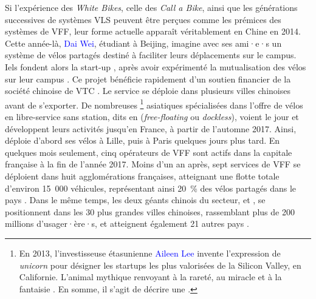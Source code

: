 \begin{refsegment}
Si l’expérience des \textsl{White Bikes}, celle des \textsl{Call a Bike}, ainsi que les générations successives de systèmes \acrshort{VLS} peuvent être perçues comme les prémices des systèmes de \acrshort{VFF}, leur forme actuelle apparaît véritablement en Chine en 2014. Cette année-là, \textcolor{blue}{Dai Wei}, étudiant à Beijing, imagine avec ses ami·e·s un système de vélos partagés destiné à faciliter leurs déplacements sur le campus. Iels fondent alors la start-up , après avoir expérimenté la mutualisation des vélos sur leur campus \textcolor{blue}{\autocite[10]{nlc_micromobility_2019}}. Ce projet bénéficie rapidement d’un soutien financier de la société chinoise de \acrshort{VTC}  \textcolor{blue}{\autocite[18]{6t-bureau_de_recherche_etude_2018}}. Le service se déploie dans plusieurs villes chinoises avant de s’exporter. De nombreuses \footnote{
    En 2013, l'investisseuse étasunienne \textcolor{blue}{Aileen Lee} invente l'expression de  \textsl{unicorn} pour désigner les startups les plus valorisées de la Silicon Valley, en Californie. L'animal mythique renvoyant à la rareté, au miracle et à la fantaisie \textcolor{blue}{\autocite{benner_unicorn_2015}}. En somme, il s'agit de décrire une  \textcolor{blue}{\autocite{chambre_de_commerce_et_dindustrie_licornes_2019}}.
} asiatiques spécialisées dans l’offre de vélos en libre-service sans station, dits en  (\textsl{free-floating} ou \textsl{dockless}), voient le jour et développent leurs activités jusqu’en France, à partir de l'automne 2017. Ainsi,  déploie d’abord ses vélos à Lille, puis à Paris quelques jours plus tard. En quelques mois seulement, cinq opérateurs de \acrshort{VFF} sont actifs dans la capitale française à la fin de l’année 2017. Moins d’un an après, sept services de \acrshort{VFF} se déploient dans huit agglomérations françaises, atteignant une flotte totale d’environ 15~000 véhicules, représentant ainsi 20~\% des vélos partagés dans le pays \textcolor{blue}{\autocite[23]{6t-bureau_de_recherche_etude_2018}}. Dans le même temps, les deux géants chinois du secteur,  et , se positionnent dans les 30 plus grandes villes chinoises, rassemblant plus de 200 millions d’usager·ère·s, et atteignent également 21 autres pays \textcolor{blue}{\autocite[22, 91]{kang_university_2020}}.%


\end{refsegment}
